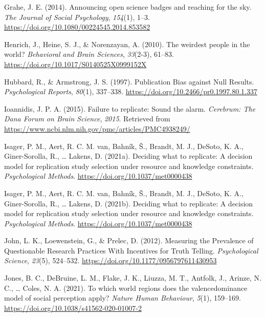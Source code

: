 \documentclass[
  man,floatsintext]{apa6}
\newlength{\cslhangindent}
\newlength{\cslentryspacingunit} %
\newenvironment{CSLReferences}[2] %
 {%
  \setlength{\parindent}{0pt}
  \ifodd #1
  \let\oldpar\par
  \def\par{\hangindent=\cslhangindent\oldpar}
  \fi
  \setlength{\parskip}{#2\cslentryspacingunit}
 }%
 {}
\begin{document}
\begin{CSLReferences}{1}{0}
\leavevmode{}%
Grahe, J. E. (2014). Announcing open science badges and reaching for the sky. \emph{The Journal of Social Psychology}, \emph{154}(1), 1--3. \url{https://doi.org/10.1080/00224545.2014.853582}

\leavevmode{}%
Henrich, J., Heine, S. J., \& Norenzayan, A. (2010). The weirdest people in the world? \emph{Behavioral and Brain Sciences}, \emph{33}(2-3), 61--83. \url{https://doi.org/10.1017/S0140525X0999152X}

\leavevmode{}%
Hubbard, R., \& Armstrong, J. S. (1997). Publication Bias against Null Results. \emph{Psychological Reports}, \emph{80}(1), 337--338. \url{https://doi.org/10.2466/pr0.1997.80.1.337}

\leavevmode{}%
Ioannidis, J. P. A. (2015). Failure to replicate: Sound the alarm. \emph{Cerebrum: The Dana Forum on Brain Science}, \emph{2015}. Retrieved from \url{https://www.ncbi.nlm.nih.gov/pmc/articles/PMC4938249/}

\leavevmode{}%
Isager, P. M., Aert, R. C. M. van, Bahník, Š., Brandt, M. J., DeSoto, K. A., Giner-Sorolla, R., \ldots{} Lakens, D. (2021a). Deciding what to replicate: A decision model for replication study selection under resource and knowledge constraints. \emph{Psychological Methods}. \url{https://doi.org/10.1037/met0000438}

\leavevmode{}%
Isager, P. M., Aert, R. C. M. van, Bahník, Š., Brandt, M. J., DeSoto, K. A., Giner-Sorolla, R., \ldots{} Lakens, D. (2021b). Deciding what to replicate: A decision model for replication study selection under resource and knowledge constraints. \emph{Psychological Methods}. \url{https://doi.org/10.1037/met0000438}

\leavevmode{}%
John, L. K., Loewenstein, G., \& Prelec, D. (2012). Measuring the Prevalence of Questionable Research Practices With Incentives for Truth Telling. \emph{Psychological Science}, \emph{23}(5), 524--532. \url{https://doi.org/10.1177/0956797611430953}

\leavevmode{}%
Jones, B. C., DeBruine, L. M., Flake, J. K., Liuzza, M. T., Antfolk, J., Arinze, N. C., \ldots{} Coles, N. A. (2021). To which world regions does the valence{\textendash}dominance model of social perception apply? \emph{Nature Human Behaviour}, \emph{5}(1), 159--169. \url{https://doi.org/10.1038/s41562-020-01007-2}


\end{CSLReferences}
\end{document}
